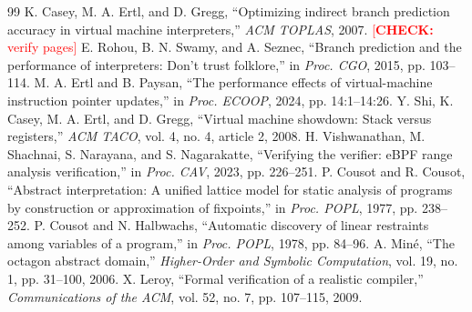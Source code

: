 \documentclass[11pt,a4paper]{article}
\newcommand{\todo}[1]{\textcolor{red}{[\textbf{CHECK:} #1]}}
\begin{document}
\begin{thebibliography}{99}
 K. Casey, M. A. Ertl, and D. Gregg, ``Optimizing indirect branch prediction accuracy in virtual machine interpreters,'' \emph{ACM TOPLAS}, 2007. \todo{verify pages}
 E. Rohou, B. N. Swamy, and A. Seznec, ``Branch prediction and the performance of interpreters: Don't trust folklore,'' in \emph{Proc. CGO}, 2015, pp. 103--114.
 M. A. Ertl and B. Paysan, ``The performance effects of virtual-machine instruction pointer updates,'' in \emph{Proc. ECOOP}, 2024, pp. 14:1--14:26.
 Y. Shi, K. Casey, M. A. Ertl, and D. Gregg, ``Virtual machine showdown: Stack versus registers,'' \emph{ACM TACO}, vol. 4, no. 4, article 2, 2008.
 H. Vishwanathan, M. Shachnai, S. Narayana, and S. Nagarakatte, ``Verifying the verifier: eBPF range analysis verification,'' in \emph{Proc. CAV}, 2023, pp. 226--251.
 P. Cousot and R. Cousot, ``Abstract interpretation: A unified lattice model for static analysis of programs by construction or approximation of fixpoints,'' in \emph{Proc. POPL}, 1977, pp. 238--252.
 P. Cousot and N. Halbwachs, ``Automatic discovery of linear restraints among variables of a program,'' in \emph{Proc. POPL}, 1978, pp. 84--96.
 A. Min\'e, ``The octagon abstract domain,'' \emph{Higher-Order and Symbolic Computation}, vol. 19, no. 1, pp. 31--100, 2006.
 X. Leroy, ``Formal verification of a realistic compiler,'' \emph{Communications of the ACM}, vol. 52, no. 7, pp. 107--115, 2009.
\end{thebibliography}
\end{document}
